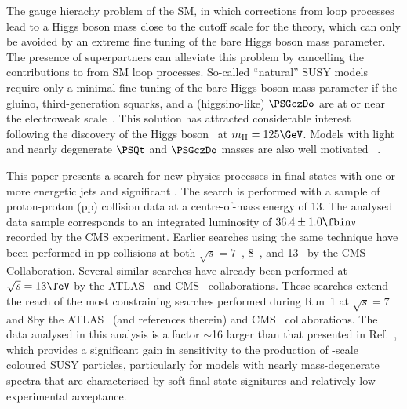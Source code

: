 The gauge hierachy problem of the SM, in which corrections from loop
processes lead to a Higgs boson mass \higgsmass close to the cutoff
scale for the theory, which can only be avoided by an extreme fine
tuning of the bare Higgs boson mass parameter. The presence of
superpartners can alleviate this problem by cancelling the
contributions to \higgsmass from SM loop processes. So-called
``natural'' SUSY models require only a minimal fine-tuning of the bare
Higgs boson mass parameter if the gluino, third-generation squarks,
and a (higgsino-like) $\PSGczDo$ are at or near the electroweak
scale~\cite{ref:barbierinsusy}. This solution has attracted
considerable interest~\cite{Delgado:2012eu, Boehm:1999tr,
  Carena:2008mj, Grober:2014aha, Grober:2015fia} following the
discovery of the Higgs boson~\cite{ref:atlashiggsdiscovery,
  ref:cmshiggsdiscovery, ref:cmshiggsdiscoverylong} at $\higgsmass =
125\GeV$. Models with light and nearly degenerate $\PSQt$ and
$\PSGczDo$ masses are also well motivated ~\cite{Boehm:1999bj,
  Balazs:2004bu, Martin:2007gf, Martin:2007hn}. 

This paper presents a search for new physics processes in final states
with one or more energetic jets and significant \ptvecmiss. The search
is performed with a sample of proton-proton (pp) collision data at a
centre-of-mass energy of 13\TeV. The analysed data sample corresponds
to an integrated luminosity of $36.4 \pm 1.0\fbinv$ recorded by the
CMS experiment. Earlier searches using the same technique have been
performed in pp collisions at both $\sqrt{s} = 7$~\cite{RA1Paper,
  RA1Paper2011, RA1Paper2011FULL}, 8~\cite{RA1Paper2012, RA1Parked},
and 13\TeV~\cite{RA1Paper2015} by the CMS Collaboration. Several
similar searches have already been performed at $\sqrt{s} = 13\TeV$ by
the ATLAS~\cite{} and CMS~\cite{} collaborations. These searches
extend the reach of the most constraining searches performed during
Run~1 at $\sqrt{s} = 7$ and 8\TeV by the ATLAS~\cite{Aad:2015iea,
  Aad:2015pfx} (and references therein) and CMS~\cite{}
collaborations. The data analysed in this analysis is a factor
$\sim$16 larger than that presented in Ref.~\cite{RA1Paper2015}, which
provides a significant gain in sensitivity to the production of
\TeV-scale coloured SUSY particles, particularly for models with
nearly mass-degenerate spectra that are characterised by soft final
state signitures and relatively low experimental acceptance.


